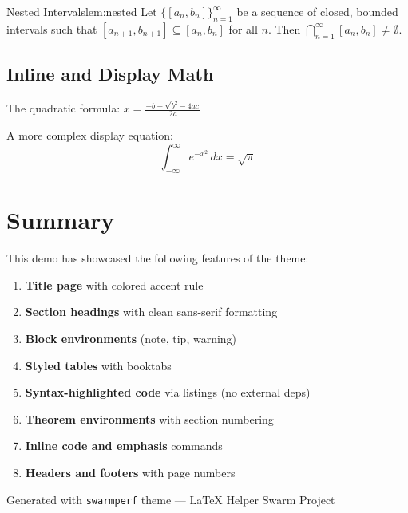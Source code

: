 \documentclass[11pt, a4paper]{article}
\begin{document}
\begin{lemma}{Nested Intervals}{lem:nested}
  Let $\{[a_n, b_n]\}_{n=1}^{\infty}$ be a sequence of closed, bounded
  intervals such that $[a_{n+1}, b_{n+1}] \subseteq [a_n, b_n]$ for all $n$.
  Then $\bigcap_{n=1}^{\infty} [a_n, b_n] \neq \emptyset$.
\end{lemma}

\subsection{Inline and Display Math}

The quadratic formula: $x = \frac{-b \pm \sqrt{b^2 - 4ac}}{2a}$

A more complex display equation:
\[
  \int_{-\infty}^{\infty} e^{-x^2} \, dx = \sqrt{\pi}
\]


\section{Summary}

This demo has showcased the following features of the  theme:

\begin{enumerate}
  \item \textbf{Title page} with colored accent rule
  \item \textbf{Section headings} with clean sans-serif formatting
  \item \textbf{Block environments} (note, tip, warning)
  \item \textbf{Styled tables} with booktabs
  \item \textbf{Syntax-highlighted code} via listings (no external deps)
  \item \textbf{Theorem environments} with section numbering
  \item \textbf{Inline code and emphasis} commands
  \item \textbf{Headers and footers} with page numbers
\end{enumerate}


\begin{center}
  \small\textcolor{spGray}{%
    Generated with \texttt{swarmperf} theme --- LaTeX Helper Swarm Project%
  }
\end{center}
\end{document}
